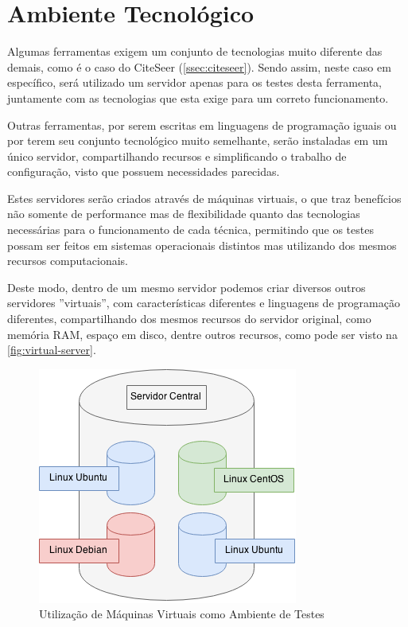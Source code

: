 \section{Ambiente Tecnológico}
\label{sec:tech-environment}

Algumas ferramentas exigem um conjunto de tecnologias muito diferente das demais, como é o caso do CiteSeer (\autoref{ssec:citeseer}). Sendo assim, neste caso em específico, será utilizado um servidor apenas para os testes desta ferramenta, juntamente com as tecnologias que esta exige para um correto funcionamento. 

Outras ferramentas, por serem escritas em linguagens de programação iguais ou por terem seu conjunto tecnológico muito semelhante, serão instaladas em um único servidor, compartilhando recursos e simplificando o trabalho de configuração, visto que possuem necessidades parecidas.

Estes servidores serão criados através de máquinas virtuais, o que traz benefícios não somente de performance mas de flexibilidade quanto das tecnologias necessárias para o funcionamento de cada técnica, permitindo que os testes possam ser feitos em sistemas operacionais distintos mas utilizando dos mesmos recursos computacionais.

Deste modo, dentro de um mesmo servidor podemos criar diversos outros servidores ''virtuais'', com características diferentes e linguagens de programação diferentes, compartilhando dos mesmos recursos do servidor original, como memória RAM, espaço em disco, dentre outros recursos, como pode ser visto na \autoref{fig:virtual-server}.

\begin{figure}
    \centering
    \caption{Utilização de Máquinas Virtuais como Ambiente de Testes}
    \label{fig:virtual-server}
    \includegraphics[width=0.6\linewidth]{./assets/images/virtual-server}
\end{figure}


